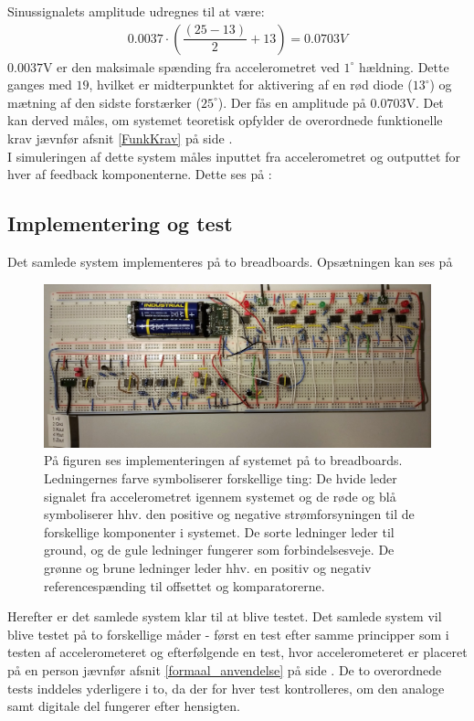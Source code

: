 \noindent Sinussignalets amplitude udregnes til at være:
\begin{eqnarray}
0.0037 \cdot (\dfrac{(25-13)}{2} + 13) = 0.0703V
\end{eqnarray}
$0.0037$V er den maksimale spænding fra accelerometret ved $1^{\circ}$ hældning. Dette ganges med $19$, hvilket er midterpunktet for aktivering af en rød diode ($13^{\circ}$) og mætning af den sidste forstærker ($25^{\circ}$). Der fås en amplitude på $0.0703$V. Det kan derved måles, om systemet teoretisk opfylder de overordnede funktionelle krav jævnfør afsnit \ref{FunkKrav} på side \pageref{FunkKrav}.\\
I simuleringen af dette system måles inputtet fra accelerometret og outputtet for hver af feedback komponenterne. Dette ses på :

\subsection{Implementering og test}
Det samlede system implementeres på to breadboards. Opsætningen kan ses på 
\begin{figure}[H]
	\centering
	\includegraphics[scale=.22]{figures/cProblemloesning/Samlet_system2.jpg}
	\caption{På figuren ses implementeringen af systemet på to breadboards. Ledningernes farve symboliserer forskellige ting: De hvide leder signalet fra accelerometret igennem systemet og de røde og blå symboliserer hhv. den positive og negative strømforsyningen til de forskellige komponenter i systemet. De sorte ledninger leder til ground, og de gule ledninger fungerer som forbindelsesveje. De grønne og brune ledninger leder hhv. en positiv og negativ referencespænding til offsettet og komparatorerne.}
	\label{fig:samlet_system_real}
\end{figure}
\noindent Herefter er det samlede system klar til at blive testet. Det samlede system vil blive testet på to forskellige måder - først en test efter samme principper som i testen af accelerometeret og efterfølgende en test, hvor accelerometeret er placeret på en person jævnfør afsnit \ref{formaal_anvendelse} på side \pageref{formaal_anvendelse}. De to overordnede tests inddeles yderligere i to, da der for hver test kontrolleres, om den analoge samt digitale del fungerer efter hensigten.

